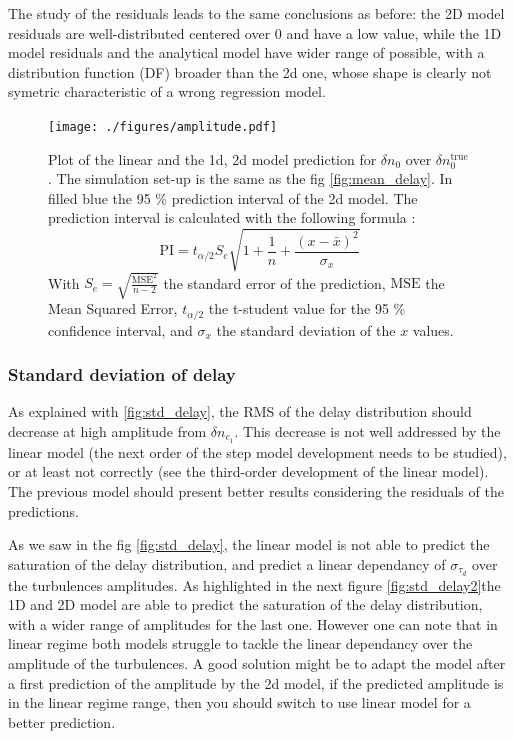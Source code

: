 \documentclass[11pt,openany]{report}
\begin{document}
\begin{multicols}{2}
    The study of the residuals leads to the same conclusions as before: the 2D model residuals are well-distributed centered over 0 and have a low value, while the 1D model residuals and the analytical model have wider range of possible, with a distribution function (DF) broader than the 2d one, whose shape is clearly not symetric characteristic of a wrong regression model.
    \begin{figure}[H]
        \centering
        \hspace*{-.2cm}\texttt{[image: ./figures/amplitude.pdf]}
        \caption{Plot of the linear and the 1d, 2d model prediction for $\delta n_0$ over  $\delta n_0^{\text{true}}$. The simulation set-up is the same as the fig \ref{fig:mean_delay}. In filled blue the 95 \% prediction interval of the 2d model. The prediction interval is calculated with the following formula : $$\text{PI} = t_{\alpha / 2} S_e \sqrt{1 + \frac{1}{n} + \frac{(x - \bar{x})^2}{\sigma_x}}$$
        With $S_e = \sqrt{ \frac{\text{MSE}^2}{n-2}}$ the standard error of the prediction, $\text{MSE}$ the Mean Squared Error,  $t_{\alpha / 2}$ the t-student value for the 95 \% confidence interval, and $\sigma_x$ the standard deviation of the $x$ values.}
        \label{fig:Amplitude}

    \end{figure}



    \subsubsection{Standard deviation of delay}

    As explained with \ref{fig:std_delay}, the RMS of the delay distribution should decrease at high amplitude from \(\delta n_{c_1}\). This decrease is not well addressed by the linear model (the next order of the step model development needs to be studied), or at least not correctly (see the third-order development of the linear model). The previous model should present better results considering the residuals of the predictions.

    As we saw in the fig \ref{fig:std_delay}, the linear model is not able to predict the saturation of the delay distribution, and predict a linear dependancy of $\sigma_{\tau_d}$ over the turbulences amplitudes. As highlighted in the next figure \ref{fig:std_delay2}the 1D and 2D model are able to predict the saturation of the delay distribution, with a wider range of amplitudes for the last one. However one can note that in linear regime both models struggle to tackle the linear dependancy over the amplitude of the turbulences. A good solution might be to adapt the model after a first prediction of the amplitude by the 2d model, if the predicted amplitude is in the linear regime range, then you should switch to use linear model for a better prediction.


\end{multicols}
\end{document}
